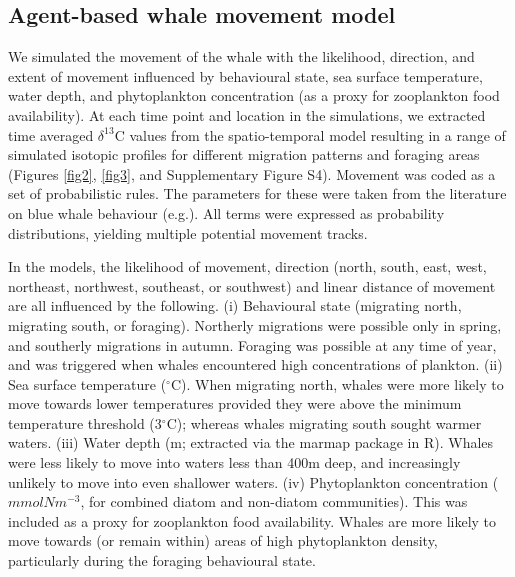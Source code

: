 \documentclass[a4paper,12pt]{article}
\begin{document}
\subsection{Agent-based whale movement model}
We simulated the movement of the whale with the likelihood, direction, and extent of movement influenced by behavioural state, sea surface temperature, water depth, and phytoplankton concentration (as a proxy for zooplankton food availability). 
At each time point and location in the simulations, we extracted time averaged $\delta^{13}$C values from the spatio-temporal model\cite{magozzi2017using} resulting in a range of simulated isotopic profiles for different migration patterns and foraging areas (Figures \ref{fig2}, \ref{fig3}, and Supplementary Figure S4). 
Movement was coded as a set of probabilistic rules. 
The parameters for these were taken from the literature on blue whale behaviour (e.g.\cite{handbook}). 
All terms were expressed as probability distributions, yielding multiple potential movement tracks. 
 
In the models, the likelihood of movement, direction (north, south, east, west, northeast, northwest, southeast, or southwest) and linear distance of movement are all influenced by the following. 
(i) Behavioural state (migrating north, migrating south, or foraging).
Northerly migrations were possible only in spring, and southerly migrations in autumn. 
Foraging was possible at any time of year, and was triggered when whales encountered high concentrations of plankton.
(ii) Sea surface temperature\cite{yool2013medusa} ($^{\circ}$C). 
When migrating north, whales were more likely to move towards lower temperatures provided they were above the minimum temperature threshold (3$^{\circ}$C); whereas whales migrating south sought warmer waters. 
(iii) Water depth\cite{bathy} (m; extracted via the marmap package in R\cite{marmap}). 
Whales were less likely to move into waters less than 400m deep, and increasingly unlikely to move into even shallower waters. 
(iv) Phytoplankton concentration ($mmolNm^{-3}$, for combined diatom and non-diatom communities\cite{yool2013medusa}). 
This was included as a proxy for zooplankton food availability. 
Whales are more likely to move towards (or remain within) areas of high phytoplankton density, particularly during the foraging behavioural state. 
\end{document}
